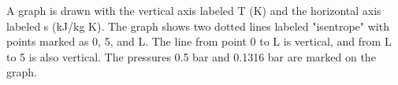 A graph is drawn with the vertical axis labeled T (K) and the horizontal axis labeled s (kJ/kg K). The graph shows two dotted lines labeled "isentrope" with points marked as 0, 5, and L. The line from point 0 to L is vertical, and from L to 5 is also vertical. The pressures 0.5 bar and 0.1316 bar are marked on the graph.